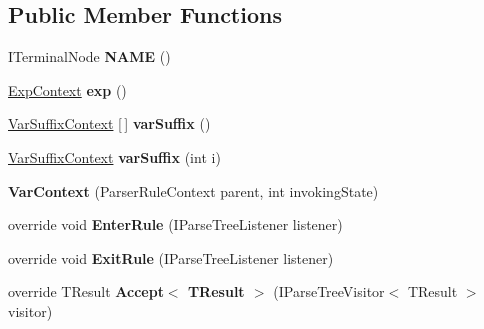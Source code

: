 \subsection*{Public Member Functions}
\begin{DoxyCompactItemize}
\item 
\mbox{\label{classzlua_1_1_lua_parser_1_1_var_context_aae7892565b5031a57ba8a7a13b87fcdc}} 
I\+Terminal\+Node {\bfseries N\+A\+ME} ()
\item 
\mbox{\label{classzlua_1_1_lua_parser_1_1_var_context_adda6487a536f281acbec1807dbfdb51a}} 
\mbox{\hyperlink{classzlua_1_1_lua_parser_1_1_exp_context}{Exp\+Context}} {\bfseries exp} ()
\item 
\mbox{\label{classzlua_1_1_lua_parser_1_1_var_context_a5cc0f2f0e93d2ad8b77018fee68009e9}} 
\mbox{\hyperlink{classzlua_1_1_lua_parser_1_1_var_suffix_context}{Var\+Suffix\+Context}} \mbox{[}$\,$\mbox{]} {\bfseries var\+Suffix} ()
\item 
\mbox{\label{classzlua_1_1_lua_parser_1_1_var_context_a3179e7eb6abcedcfe01b3c238b0d30b5}} 
\mbox{\hyperlink{classzlua_1_1_lua_parser_1_1_var_suffix_context}{Var\+Suffix\+Context}} {\bfseries var\+Suffix} (int i)
\item 
\mbox{\label{classzlua_1_1_lua_parser_1_1_var_context_ad7cf329fea64f5181f0a070f24a14ea5}} 
{\bfseries Var\+Context} (Parser\+Rule\+Context parent, int invoking\+State)
\item 
\mbox{\label{classzlua_1_1_lua_parser_1_1_var_context_a0bef5b2750dc51e8330b140707cd2b31}} 
override void {\bfseries Enter\+Rule} (I\+Parse\+Tree\+Listener listener)
\item 
\mbox{\label{classzlua_1_1_lua_parser_1_1_var_context_a40b1cf41bb9e53a006637bd085837839}} 
override void {\bfseries Exit\+Rule} (I\+Parse\+Tree\+Listener listener)
\item 
\mbox{\label{classzlua_1_1_lua_parser_1_1_var_context_ad0122896c614170da54f960042c84bb5}} 
override T\+Result {\bfseries Accept$<$ T\+Result $>$} (I\+Parse\+Tree\+Visitor$<$ T\+Result $>$ visitor)
\end{DoxyCompactItemize}
